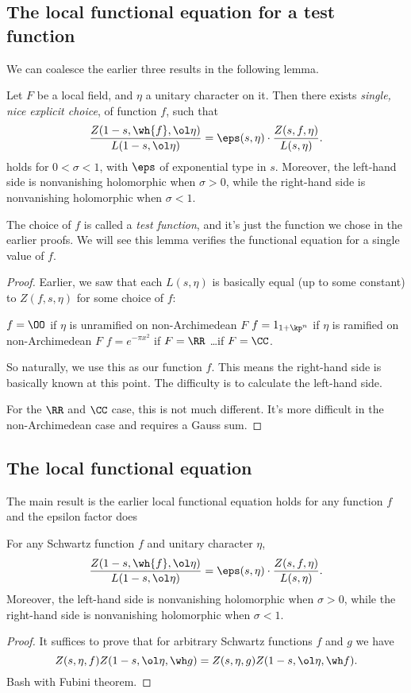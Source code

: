 \subsection{The local functional equation for a test function}
We can coalesce the earlier three results in the following lemma.
\begin{proposition}
  Let $F$ be a local field, and $\eta$ a unitary character on it.
  Then there exists \emph{single, nice explicit choice}, of function $f$,
  such that
  \[ \frac{Z(1-s, \wh{f}, \ol\eta)}{L(1-s, \ol\eta)}
  = \eps(s, \eta) \cdot \frac{Z(s, f, \eta)}{L(s, \eta)}. \]
  holds for $0 < \sigma < 1$,
  with $\eps$ of exponential type in $s$.
  Moreover, the left-hand side is nonvanishing holomorphic when $\sigma > 0$,
  while the right-hand side is nonvanishing holomorphic when $\sigma < 1$.
\end{proposition}
The choice of $f$ is called a \emph{test function},
and it's just the function we chose in the earlier proofs.
We will see this lemma
verifies the functional equation for a single value of $f$.
\begin{proof}
  Earlier, we saw that each $L(s, \eta)$
  is basically equal (up to some constant) to
  $Z(f, s, \eta)$ for some choice of $f$:
  \begin{itemize}
    \ii $f = \OO$ if $\eta$ is unramified on non-Archimedean $F$
    \ii $f = 1_{1+\kp^n}$ if $\eta$ is ramified on non-Archimedean $F$
    \ii $f = e^{-\pi x^2}$ if $F = \RR$
    \ii \dots if $F = \CC$.
  \end{itemize}
  So naturally, we use this as our function $f$.
  This means the right-hand side is basically known at this point.
  The difficulty is to calculate the left-hand side.

  For the $\RR$ and $\CC$ case, this is not much different.
  It's more difficult in the non-Archimedean case and requires a Gauss sum.
\end{proof}

\subsection{The local functional equation}
The main result is the earlier local functional equation holds
for any function $f$ and the epsilon factor does
\begin{theorem}
  For any Schwartz function $f$ and unitary character $\eta$,
  \[ \frac{Z(1-s, \wh{f}, \ol\eta)}{L(1-s, \ol\eta)}
  = \eps(s, \eta) \cdot \frac{Z(s, f, \eta)}{L(s, \eta)}. \]
  Moreover, the left-hand side is nonvanishing holomorphic when $\sigma > 0$,
  while the right-hand side is nonvanishing holomorphic when $\sigma < 1$.
\end{theorem}
\begin{proof}
  It suffices to prove that for arbitrary Schwartz functions $f$ and $g$ we have
  \[ Z(s, \eta, f) Z(1-s, \ol\eta, \wh g)
    = Z(s,\eta, g)Z(1-s, \ol\eta, \wh f). \]
  Bash with Fubini theorem.
\end{proof}


